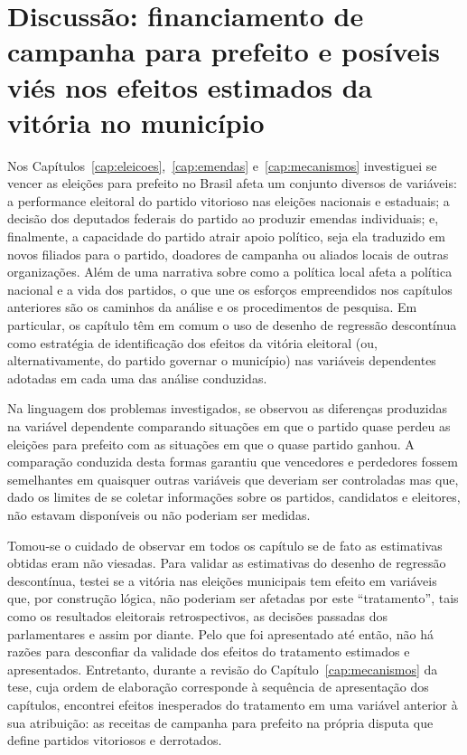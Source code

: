 \chapter{Discussão: financiamento de campanha para prefeito e posíveis viés nos efeitos estimados da vitória no município}
\label{cap:financiamento}

Nos Capítulos~\ref{cap:eleicoes},~\ref{cap:emendas} e~\ref{cap:mecanismos} investiguei se vencer as eleições para prefeito no Brasil afeta um conjunto diversos de variáveis: a performance eleitoral do partido vitorioso nas eleições nacionais e estaduais; a decisão dos deputados federais do partido ao produzir emendas individuais; e, finalmente, a capacidade do partido atrair apoio político, seja ela traduzido em novos filiados para o partido, doadores de campanha ou aliados locais de outras organizações. Além de uma narrativa sobre como a política local afeta a política nacional e a vida dos partidos, o que une os esforços empreendidos nos capítulos anteriores são os caminhos da análise e os procedimentos de pesquisa. Em particular, os capítulo têm em comum o uso de desenho de regressão descontínua como estratégia de identificação dos efeitos da vitória eleitoral (ou, alternativamente, do partido governar o município) nas variáveis dependentes adotadas em cada uma das análise conduzidas.

Na linguagem dos problemas investigados, se observou as diferenças produzidas na variável dependente comparando situações em que o partido quase perdeu as eleições para prefeito com as situações em que o quase partido ganhou. A comparação conduzida desta formas garantiu que vencedores e perdedores fossem semelhantes em quaisquer outras variáveis que deveriam ser controladas mas que, dado os limites de se coletar informações sobre os partidos, candidatos e eleitores, não estavam disponíveis ou não poderiam ser medidas.

Tomou-se o cuidado de observar em todos os capítulo se de fato as estimativas obtidas eram não viesadas. Para validar as estimativas do desenho de regressão descontínua, testei se a vitória nas eleições municipais tem efeito em variáveis que, por construção lógica, não poderiam ser afetadas por este ``tratamento'', tais como os resultados eleitorais retrospectivos, as decisões passadas dos parlamentares e assim por diante. Pelo que foi apresentado até então, não há razões para desconfiar da validade dos efeitos do tratamento estimados e apresentados. Entretanto, durante a revisão do Capítulo~\ref{cap:mecanismos} da tese, cuja ordem de elaboração corresponde à sequência de apresentação dos capítulos, encontrei efeitos inesperados do tratamento em uma variável anterior à sua atribuição: as receitas de campanha para prefeito na própria disputa que define partidos vitoriosos e derrotados.

